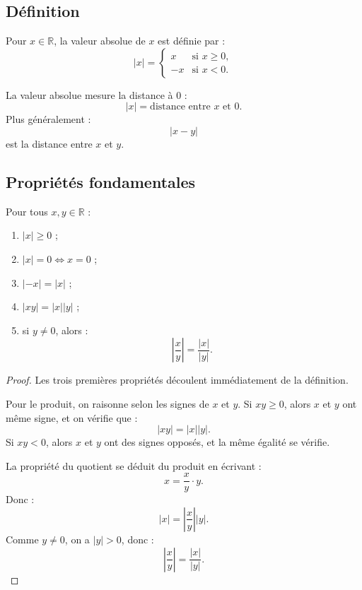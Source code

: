 \documentclass[11pt,a4paper]{article}
\newcommand{\R}{\mathbb R}
\newcommand{\abs}[1]{\left|#1\right|}
\newcommand{\ssi}{\Longleftrightarrow}
\begin{document}
\subsection{Définition}

\begin{definitionbox}
Pour \(x\in\R\), la valeur absolue de \(x\) est définie par :
\[
\abs{x}=
\begin{cases}
x & \text{si } x\geq0,\\
-x & \text{si } x<0.
\end{cases}
\]
\end{definitionbox}

\begin{retenirbox}
La valeur absolue mesure la distance à \(0\) :
\[
\abs{x}=\text{distance entre }x\text{ et }0.
\]
Plus généralement :
\[
\abs{x-y}
\]
est la distance entre \(x\) et \(y\).
\end{retenirbox}

\subsection{Propriétés fondamentales}

\begin{theorembox}
Pour tous \(x,y\in\R\) :
\begin{enumerate}
    \item \(\abs{x}\geq0\) ;
    \item \(\abs{x}=0 \ssi x=0\) ;
    \item \(\abs{-x}=\abs{x}\) ;
    \item \(\abs{xy}=\abs{x}\abs{y}\) ;
    \item si \(y\neq0\), alors :
    \[
    \abs{\frac xy}=\frac{\abs{x}}{\abs{y}}.
    \]
\end{enumerate}
\end{theorembox}

\begin{proof}
Les trois premières propriétés découlent immédiatement de la définition.

Pour le produit, on raisonne selon les signes de \(x\) et \(y\).  
Si \(xy\geq0\), alors \(x\) et \(y\) ont même signe, et on vérifie que :
\[
\abs{xy}=\abs{x}\abs{y}.
\]
Si \(xy<0\), alors \(x\) et \(y\) ont des signes opposés, et la même égalité se vérifie.

La propriété du quotient se déduit du produit en écrivant :
\[
x=\frac xy\cdot y.
\]
Donc :
\[
\abs{x}=\abs{\frac xy}\abs{y}.
\]
Comme \(y\neq0\), on a \(\abs{y}>0\), donc :
\[
\abs{\frac xy}=\frac{\abs{x}}{\abs{y}}.
\]
\end{proof}
\end{document}
